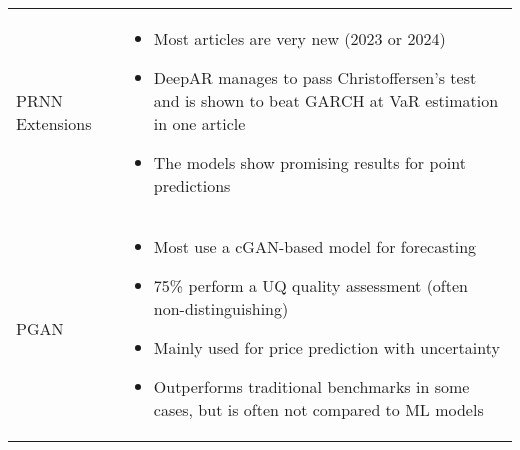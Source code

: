 \begin{table}[H]
\begin{adjustbox}{width=1\textwidth,center}
\begin{tabular}{p{}p{}}
        \addlinespace
        \hdashline[0.2pt/3pt]
        \addlinespace
        PRNN Extensions & 
        \begin{itemize}[left=0pt]
        \vspace{-4mm}
            \item Most articles are very new (2023 or 2024)
            \item DeepAR manages to pass Christoffersen's test and is shown to beat GARCH at VaR estimation in one article
            \item The models show promising results for point predictions
        \end{itemize}\\
        \addlinespace
        \hdashline[0.2pt/3pt]
        \addlinespace
        PGAN & 
        \begin{itemize}[left=0pt]
        \vspace{-4mm}
            \item Most use a cGAN-based model for forecasting
            \item 75\% perform a UQ quality assessment (often non-distinguishing)
            \item Mainly used for price prediction with uncertainty
            \item Outperforms traditional benchmarks in some cases, but is often not compared to ML models
        \end{itemize}\\


\end{tabular}
\end{adjustbox}
\end{table}
